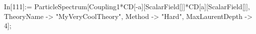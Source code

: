 In[111]:= ParticleSpectrum[Coupling1*CD[-a][ScalarField[]]*CD[a][ScalarField[]], TheoryName -> "MyVeryCoolTheory", Method -> "Hard", MaxLaurentDepth -> 4]; 